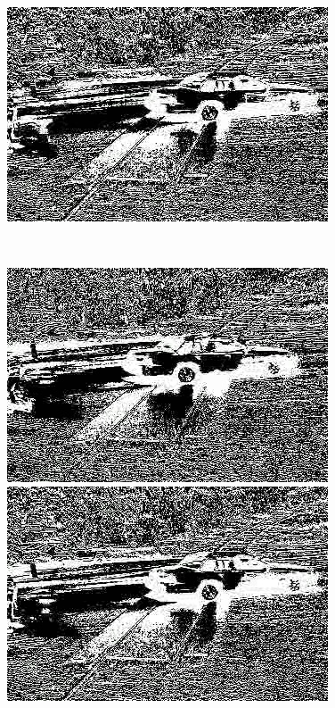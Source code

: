 \documentclass[a4paper]{ctexart}
\begin{document}
\begin{enumerate}[label=\arabic*、]
\begin{figure}[htbp]
\begin{minipage}[t]{0.2\textwidth}
		\end{minipage}
		\begin{minipage}[t]{0.2\textwidth}
			\centering
			\includegraphics[width=\textwidth]{figure/frames/avg29415.jpg}
		\end{minipage}\\
		\begin{minipage}[t]{0.2\textwidth}
			\centering
			\includegraphics[width=\textwidth]{figure/frames/avg39400.jpg}
		\end{minipage}
		\begin{minipage}[t]{0.2\textwidth}
			\centering
			\includegraphics[width=\textwidth]{figure/frames/avg39405.jpg}

\end{minipage}
\end{figure}
\end{enumerate}
\end{document}
